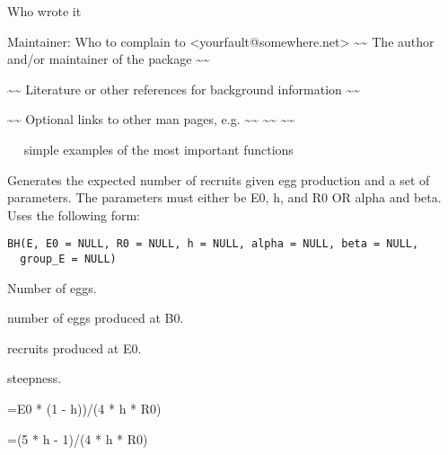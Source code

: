 \documentclass[letterpaper]{book}
\begin{document}
%
\begin{Author}\relax
Who wrote it

Maintainer: Who to complain to <yourfault@somewhere.net>
\textasciitilde{}\textasciitilde{} The author and/or maintainer of the package \textasciitilde{}\textasciitilde{}
\end{Author}
%
\begin{References}\relax
\textasciitilde{}\textasciitilde{} Literature or other references for background information \textasciitilde{}\textasciitilde{}
\end{References}
%
\begin{SeeAlso}\relax
\textasciitilde{}\textasciitilde{} Optional links to other man pages, e.g. \textasciitilde{}\textasciitilde{}
\textasciitilde{}\textasciitilde{}  \textasciitilde{}\textasciitilde{}
\end{SeeAlso}
%
\begin{Examples}
\begin{ExampleCode}
~~ simple examples of the most important functions ~~
\end{ExampleCode}
\end{Examples}
%
\begin{Description}\relax
Generates the expected number of recruits given egg production and a set of parameters.  The parameters must either be E0, h, and R0 OR alpha and beta. Uses the following form: 
\end{Description}
%
\begin{Usage}
\begin{verbatim}
BH(E, E0 = NULL, R0 = NULL, h = NULL, alpha = NULL, beta = NULL,
  group_E = NULL)
\end{verbatim}
\end{Usage}
%
\begin{Arguments}
\begin{ldescription}
\item[\code{E}] Number of eggs.

\item[\code{E0}] number of eggs produced at B0.

\item[\code{R0}] recruits produced at E0.

\item[\code{h}] steepness.

\item[\code{alpha}] =E0 * (1 - h))/(4 * h * R0)

\item[\code{beta}] =(5 * h - 1)/(4 * h * R0)
\end{ldescription}
\end{Arguments}
\end{document}
